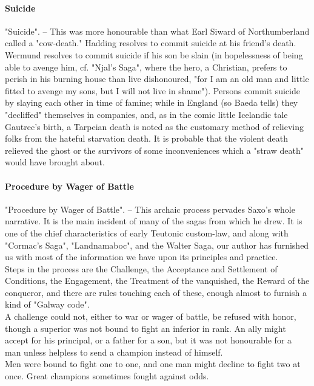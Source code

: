 \documentclass[10pt,a4paper]{report}
\begin{document}
\paragraph*{Suicide}
"Suicide". -- This was more honourable than what Earl Siward of Northumberland called a "cow-death." Hadding resolves to commit suicide at his friend's death. Wermund resolves to commit suicide if his son be slain (in hopelessness of being able to avenge him, cf. "Njal's Saga", where the hero, a Christian, prefers to perish in his burning house than live dishonoured, "for I am an old man and little fitted to avenge my sons, but I will not live in shame"). Persons commit suicide by slaying each other in time of famine; while in England (so Baeda tells) they "decliffed" themselves in companies, and, as in the comic little Icelandic tale Gautrec's birth, a Tarpeian death is noted as the customary method of relieving folks from the hateful starvation death. It is probable that the violent death relieved the ghost or the survivors of some inconveniences which a "straw death" would have brought about.\\

\paragraph*{Procedure by Wager of Battle}
"Procedure by Wager of Battle". -- This archaic process pervades Saxo's whole narrative. It is the main incident of many of the sagas from which he drew. It is one of the chief characteristics of early Teutonic custom-law, and along with "Cormac's Saga", "Landnamaboc", and the Walter Saga, our author has furnished us with most of the information we have upon its principles and practice.\\

Steps in the process are the Challenge, the Acceptance and Settlement of Conditions, the Engagement, the Treatment of the vanquished, the Reward of the conqueror, and there are rules touching each of these, enough almost to furnish a kind of "Galway code".\\

A challenge could not, either to war or wager of battle, be refused with honor, though a superior was not bound to fight an inferior in rank. An ally might accept for his principal, or a father for a son, but it was not honourable for a man unless helpless to send a champion instead of himself.\\

Men were bound to fight one to one, and one man might decline to fight two at once. Great champions sometimes fought against odds.\\
\end{document}
